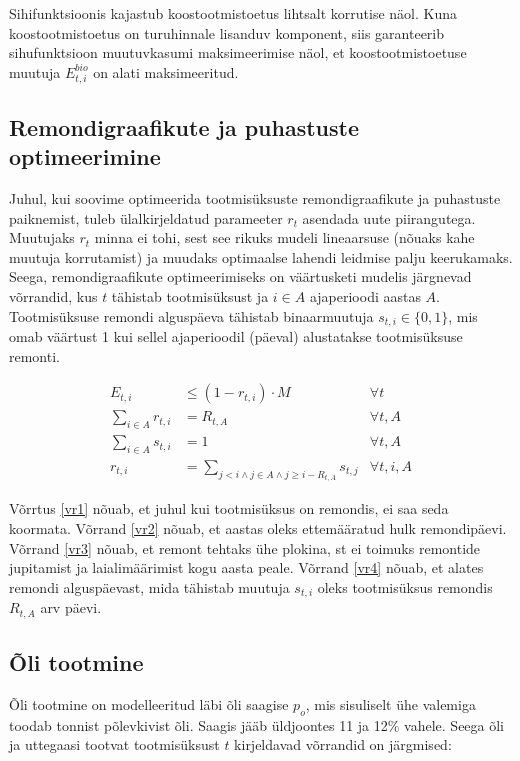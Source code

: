 \documentclass[10pt,a4paper]{article}
\begin{document}
Sihifunktsioonis kajastub koostootmistoetus lihtsalt korrutise näol. Kuna koostootmistoetus on turuhinnale lisanduv komponent, siis garanteerib sihufunktsioon muutuvkasumi maksimeerimise näol, et koostootmistoetuse muutuja $E^{bio}_{t,i}$ on alati maksimeeritud.

\subsection{Remondigraafikute ja puhastuste optimeerimine}
Juhul, kui soovime optimeerida tootmisüksuste remondigraafikute ja puhastuste paiknemist, tuleb ülalkirjeldatud parameeter $r_t$ asendada uute piirangutega. Muutujaks $r_t$ minna ei tohi, sest see rikuks mudeli lineaarsuse (nõuaks kahe muutuja korrutamist) ja muudaks optimaalse lahendi leidmise palju keerukamaks. Seega, remondigraafikute optimeerimiseks on väärtusketi mudelis järgnevad võrrandid, kus $t$ tähistab tootmisüksust ja $i\in A$ ajaperioodi aastas $A$. Tootmisüksuse remondi alguspäeva tähistab binaarmuutuja $s_{t,i} \in \{0,1\}$, mis omab väärtust 1 kui sellel ajaperioodil (päeval) alustatakse tootmisüksuse remonti.

\begin{align}
E_{t,i} &\leq (1 - r_{t,i}) \cdot M & \forall t \label{vr1} \\  
\sum_{i \in A} r_{t,i} &= R_{t,A} & \forall t, A \label{vr2} \\ 
\sum_{i \in A} s_{t,i} &= 1 & \forall t, A \label{vr3} \\
r_{t,i} &= \sum_{j < i \land  j \in A \land j \geq i - R_{t,A} } s_{t,j} & \forall t, i, A \label{vr4}
\end{align}

Võrrtus \eqref{vr1} nõuab, et juhul kui tootmisüksus on remondis, ei saa seda koormata. Võrrand \eqref{vr2} nõuab, et aastas oleks ettemääratud hulk remondipäevi. Võrrand \eqref{vr3} nõuab, et remont tehtaks ühe plokina, st ei toimuks remontide jupitamist ja laialimäärimist kogu aasta peale. Võrrand \eqref{vr4} nõuab, et alates remondi alguspäevast, mida tähistab muutuja $s_{t,i}$ oleks tootmisüksus remondis $R_{t,A}$ arv päevi.

\subsection{Õli tootmine}
Õli tootmine on modelleeritud läbi õli saagise $p_o$, mis sisuliselt ühe valemiga toodab tonnist põlevkivist õli. Saagis jääb üldjoontes 11 ja 12\% vahele. Seega õli ja uttegaasi tootvat tootmisüksust $t$ kirjeldavad võrrandid on järgmised:
\end{document}
